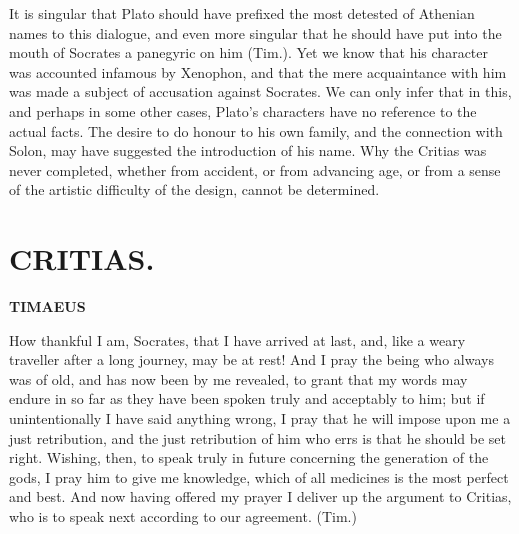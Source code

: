 \documentclass[11pt,letter]{article}
\begin{document}
\par  It is singular that Plato should have prefixed the most detested of Athenian names to this dialogue, and even more singular that he should have put into the mouth of Socrates a panegyric on him (Tim.). Yet we know that his character was accounted infamous by Xenophon, and that the mere acquaintance with him was made a subject of accusation against Socrates. We can only infer that in this, and perhaps in some other cases, Plato's characters have no reference to the actual facts. The desire to do honour to his own family, and the connection with Solon, may have suggested the introduction of his name. Why the Critias was never completed, whether from accident, or from advancing age, or from a sense of the artistic difficulty of the design, cannot be determined.

\par 

\par 
\section{
      CRITIAS.
    }
\par 
 
\par 

\par \textbf{TIMAEUS}
\par   How thankful I am, Socrates, that I have arrived at last, and, like a weary traveller after a long journey, may be at rest! And I pray the being who always was of old, and has now been by me revealed, to grant that my words may endure in so far as they have been spoken truly and acceptably to him; but if unintentionally I have said anything wrong, I pray that he will impose upon me a just retribution, and the just retribution of him who errs is that he should be set right. Wishing, then, to speak truly in future concerning the generation of the gods, I pray him to give me knowledge, which of all medicines is the most perfect and best. And now having offered my prayer I deliver up the argument to Critias, who is to speak next according to our agreement. (Tim.)
\end{document}
